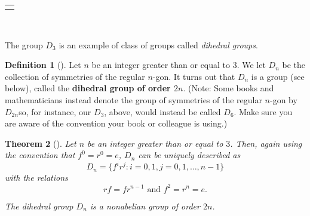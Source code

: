 \documentclass[10pt,]{book}
\newcommand{\terminology}[1]{\textbf{#1}}
\theoremstyle{plain}
\newtheorem{theorem}{Theorem}[section]
\theoremstyle{definition}
\newtheorem{definition}[theorem]{Definition}
\theoremstyle{definition}
\theoremstyle{definition}
\theoremstyle{definition}
\numberwithin{equation}{section}
\newlength{\panelmax}
\begin{document}
{%
\setlength{\panelmax}{0pt}
\newsavebox{\panelboxMtabular}
\newlength{\phMtabular}\setlength{\phMtabular}{\ht\panelboxMtabular+\dp\panelboxMtabular}
\settototalheight{\phMtabular}{\usebox{\panelboxMtabular}}
\setlength{\panelmax}{\maxof{\panelmax}{\phMtabular}}
\leavevmode%
\setlength{\tabcolsep}{0\linewidth}
\par\medskip\noindent
\begin{tabular}{@{}*{1}{c}@{}}
\begin{minipage}[c][\panelmax][t]{1\linewidth}\usebox{\panelboxMtabular}\end{minipage}\end{tabular}\\
}%
\par
The group \(D_3\) is an example of class of groups called \emph{dihedral groups}.%
\begin{definition}[{}]\label{definition-54}
\label{notation-62}
Let \(n\) be an integer greater than or equal to \(3\). We let \(D_n\) be the collection of symmetries of the regular \(n\)-gon. It turns out that \(D_n\) is a group (see below), called the \terminology{dihedral group of order \(2n\)}. (Note: Some books and mathematicians instead denote the group of symmetries of the regular \(n\)-gon by \(D_{2n}\)\textemdash{}so, for instance, our \(D_3\), above, would instead be called \(D_6\). Make sure you are aware of the convention your book or colleague is using.)%
\end{definition}
\begin{theorem}[{}]\label{rf}
Let \(n\) be an integer greater than or equal to \(3\). Then, again using the convention that \(f^0=r^0=e\), \(D_n\) can be uniquely described as%
\begin{equation*}
D_n=\{f^ir^j: i=0,1, j=0,1,\ldots, n-1\}
\end{equation*}
with the relations%
\begin{equation*}
rf=fr^{n-1} \text{ and }  f^2=r^n=e.
\end{equation*}
%
\par
The dihedral group \(D_n\) is a nonabelian group of order \(2n\).%
\end{theorem}
\end{document}
